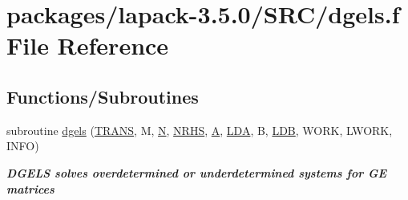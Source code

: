 \hypertarget{dgels_8f}{}\section{packages/lapack-\/3.5.0/\+S\+R\+C/dgels.f File Reference}
\label{dgels_8f}
\subsection*{Functions/\+Subroutines}
\begin{DoxyCompactItemize}
\item 
subroutine \hyperlink{group__doubleGEsolve_ga225c8efde208eaf246882df48e590eac}{dgels} (\hyperlink{superlu__enum__consts_8h_a0c4e17b2d5cea33f9991ccc6a6678d62a1f61e3015bfe0f0c2c3fda4c5a0cdf58}{T\+R\+A\+N\+S}, M, \hyperlink{polmisc_8c_a0240ac851181b84ac374872dc5434ee4}{N}, \hyperlink{example__user_8c_aa0138da002ce2a90360df2f521eb3198}{N\+R\+H\+S}, \hyperlink{classA}{A}, \hyperlink{example__user_8c_ae946da542ce0db94dced19b2ecefd1aa}{L\+D\+A}, B, \hyperlink{example__user_8c_a50e90a7104df172b5a89a06c47fcca04}{L\+D\+B}, W\+O\+R\+K, L\+W\+O\+R\+K, I\+N\+F\+O)
\begin{DoxyCompactList}\small\item\em {\bfseries  D\+G\+E\+L\+S solves overdetermined or underdetermined systems for G\+E matrices} \end{DoxyCompactList}\end{DoxyCompactItemize}
